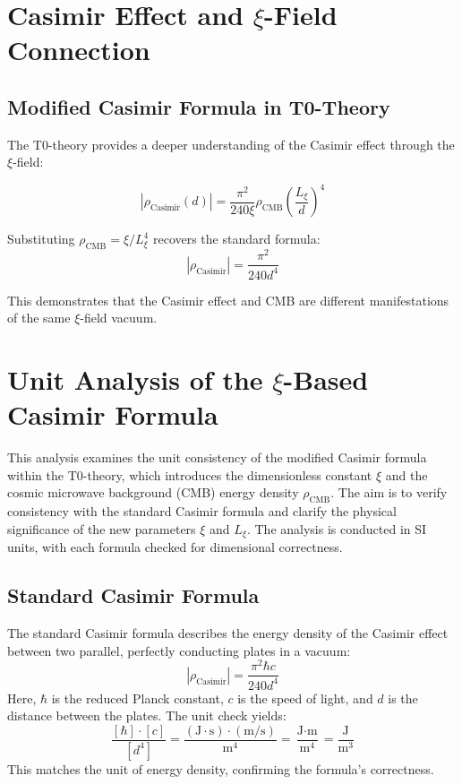 \documentclass[12pt,a4paper]{report}
\begin{document}
	\section{Casimir Effect and $\xi$-Field Connection}
	
	\subsection{Modified Casimir Formula in T0-Theory}
	
	The T0-theory provides a deeper understanding of the Casimir effect through the $\xi$-field:
	
	\begin{equation}
		|\rho_{\text{Casimir}}(d)| = \frac{\pi^2}{240 \xi} \rho_{\text{CMB}} \left(\frac{L_\xi}{d}\right)^4
	\end{equation}
	
	Substituting $\rho_{\text{CMB}} = \xi/L_\xi^4$ recovers the standard formula:
	\begin{equation}
		|\rho_{\text{Casimir}}| = \frac{\pi^2}{240 d^4}
	\end{equation}
	
	This demonstrates that the Casimir effect and CMB are different manifestations of the same $\xi$-field vacuum.
	
	\section{Unit Analysis of the $\xi$-Based Casimir Formula}
	
	This analysis examines the unit consistency of the modified Casimir formula within the T0-theory, which introduces the dimensionless constant $\xi$ and the cosmic microwave background (CMB) energy density $\rho_{\text{CMB}}$. The aim is to verify consistency with the standard Casimir formula and clarify the physical significance of the new parameters $\xi$ and $L_\xi$. The analysis is conducted in SI units, with each formula checked for dimensional correctness.
	
	\subsection{Standard Casimir Formula}
	The standard Casimir formula describes the energy density of the Casimir effect between two parallel, perfectly conducting plates in a vacuum:
	\begin{equation}
		|\rho_{\text{Casimir}}| = \frac{\pi^2 \hbar c}{240 d^4}
	\end{equation}
	Here, $\hbar$ is the reduced Planck constant, $c$ is the speed of light, and $d$ is the distance between the plates. The unit check yields:
	\begin{equation}
		\frac{[\hbar] \cdot [c]}{[d^4]} = \frac{(\text{J} \cdot \text{s}) \cdot (\text{m}/\text{s})}{\text{m}^4} = \frac{\text{J} \cdot \text{m}}{\text{m}^4} = \frac{\text{J}}{\text{m}^3}
	\end{equation}
	This matches the unit of energy density, confirming the formula's correctness.
	
\end{document}
